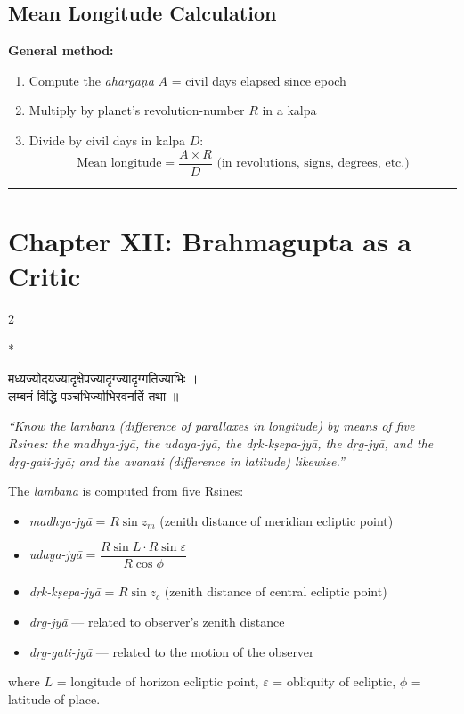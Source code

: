 \documentclass[11pt,a4paper]{article}
\newcommand{\longline}{\noindent\rule{\textwidth}{0.4pt}}
\newcommand{\dev}[1]{{\devanagarifont #1}}
\theoremstyle{definition}
\begin{document}
\subsection*{Mean Longitude Calculation}

\textbf{General method:}
\begin{enumerate}
  \item Compute the \textit{aharga\d{n}a} $A$ = civil days elapsed since epoch
  \item Multiply by planet's revolution-number $R$ in a kalpa
  \item Divide by civil days in kalpa $D$:
  \[
  \text{Mean longitude} = \frac{A \times R}{D} \text{ (in revolutions, signs, degrees, etc.)}
  \]
\end{enumerate}

\longline

\section{Chapter XII: Brahmagupta as a Critic}
\label{sec:critic}

\begin{paracol}{2}

\switchcolumn[0]*\noindent
\begin{tcolorbox}[colback=sktbg,colframe=vertrule,boxrule=0.5pt,arc=3pt]
\dev{मध्यज्योदयज्यादृक्षेपज्यादृग्ज्यादृग्गतिज्याभिः ।\\
लम्बनं विद्धि पञ्चभिर्ज्याभिरवनतिं तथा ॥}
\end{tcolorbox}

\switchcolumn\noindent
\begin{tcolorbox}[colback=transbg,colframe=vertrule!60,boxrule=0.5pt,arc=3pt]
\textit{``Know the lambana (difference of parallaxes in longitude) by means of five Rsines: the madhya-jy\=a, the udaya-jy\=a, the d\d{r}k-k\d{s}epa-jy\=a, the d\d{r}g-jy\=a, and the d\d{r}g-gati-jy\=a; and the avanati (difference in latitude) likewise.''}

The \textit{lambana} is computed from five Rsines:
\begin{itemize}
  \item \textit{madhya-jy\=a} = $R\sin z_m$ (zenith distance of meridian ecliptic point)
  \item \textit{udaya-jy\=a} = $\dfrac{R\sin L \cdot R\sin\varepsilon}{R\cos\phi}$
  \item \textit{d\d{r}k-k\d{s}epa-jy\=a} = $R\sin z_c$ (zenith distance of central ecliptic point)
  \item \textit{d\d{r}g-jy\=a} --- related to observer's zenith distance
  \item \textit{d\d{r}g-gati-jy\=a} --- related to the motion of the observer
\end{itemize}
where $L$ = longitude of horizon ecliptic point, $\varepsilon$ = obliquity of ecliptic, $\phi$ = latitude of place.
\end{tcolorbox}

\end{paracol}
\end{document}
